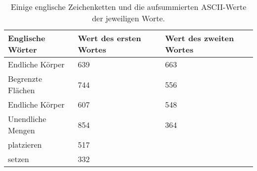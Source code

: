 \begin{table}[h!tb]
    \centering
    \begin{tabularx}{\textwidth}{X X X}
        \toprule
            Englische Wörter & Wert des ersten Wortes & Wert des zweiten Wortes \\
        \midrule
            Endliche Körper & 639 & 663 \\[-13px]
            Begrenzte Flächen & 744 & 556 \\[1em]
        \midrule
            Endliche Körper & 607 & 548 \\[-13px]
            Unendliche Mengen & 854 & 364 \\[1em]
        \midrule
            platzieren & 517 & \\[-13px]
            setzen & 332 \\[-1em]
        \bottomrule
    \end{tabularx}
    \caption{Einige englische Zeichenketten und die aufsummierten ASCII-Werte der jeweiligen Worte.}
\end{table}
